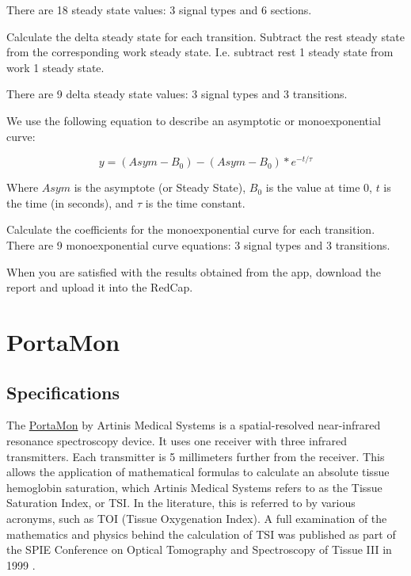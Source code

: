 \documentclass[
]{book}
\begin{document}
There are 18 steady state values: 3 signal types and 6 sections.

Calculate the delta steady state for each transition.
Subtract the rest steady state from the corresponding work steady state. I.e. subtract rest 1 steady state from work 1 steady state.

There are 9 delta steady state values: 3 signal types and 3 transitions.

We use the following equation to describe an asymptotic or monoexponential curve:

\[y =({Asym}-B_0) - ({Asym}-B_0)*e^{-t/ \tau} \]

Where \({Asym}\) is the asymptote (or Steady State), \(B_0\) is the value at time 0, \(t\) is the time (in seconds), and \(\tau\) is the time constant.

Calculate the coefficients for the monoexponential curve for each transition. There are 9 monoexponential curve equations: 3 signal types and 3 transitions.

When you are satisfied with the results obtained from the app, download the report and upload it into the RedCap.

\hypertarget{appendix-appendix}{%
\appendix}


\hypertarget{PortaMon}{%
\chapter{PortaMon}\label{PortaMon}}

\hypertarget{PortaMon-Specs}{%
\section{Specifications}\label{PortaMon-Specs}}

The \href{https://www.artinis.com/portamon}{PortaMon} by Artinis Medical Systems is a spatial-resolved near-infrared resonance spectroscopy device. It uses one receiver with three infrared transmitters. Each transmitter is 5 millimeters further from the receiver. This allows the application of mathematical formulas to calculate an absolute tissue hemoglobin saturation, which Artinis Medical Systems refers to as the Tissue Saturation Index, or TSI. In the literature, this is referred to by various acronyms, such as TOI (Tissue Oxygenation Index). A full examination of the mathematics and physics behind the calculation of TSI was published as part of the SPIE Conference on Optical Tomography and Spectroscopy of Tissue III in 1999 \citep{Suzuki1999TissueOM}.
\end{document}
